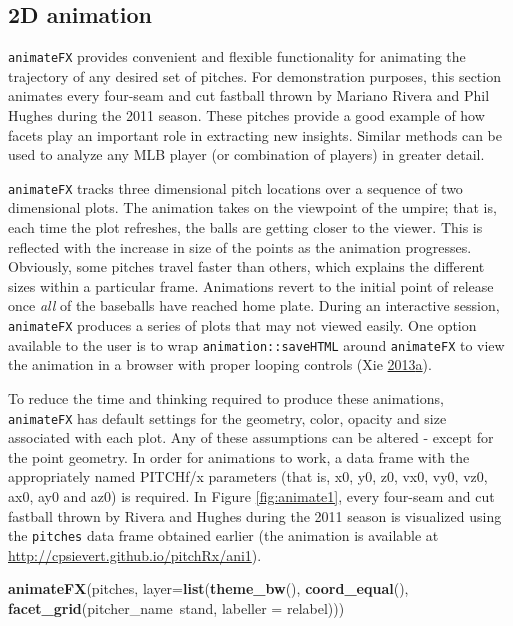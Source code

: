 \documentclass[12pt,]{isuthesis}
\newenvironment{Shaded}{\begin{snugshade}}{\end{snugshade}}
\newcommand{\KeywordTok}[1]{\textcolor[rgb]{0.13,0.29,0.53}{\textbf{{#1}}}}
\newcommand{\DataTypeTok}[1]{\textcolor[rgb]{0.13,0.29,0.53}{{#1}}}
\newcommand{\NormalTok}[1]{{#1}}
\begin{document}
\subsection{2D animation}\label{d-animation}

\texttt{animateFX} provides convenient and flexible functionality for
animating the trajectory of any desired set of pitches. For
demonstration purposes, this section animates every four-seam and cut
fastball thrown by Mariano Rivera and Phil Hughes during the 2011
season. These pitches provide a good example of how facets play an
important role in extracting new insights. Similar methods can be used
to analyze any MLB player (or combination of players) in greater detail.

\texttt{animateFX} tracks three dimensional pitch locations over a
sequence of two dimensional plots. The animation takes on the viewpoint
of the umpire; that is, each time the plot refreshes, the balls are
getting closer to the viewer. This is reflected with the increase in
size of the points as the animation progresses. Obviously, some pitches
travel faster than others, which explains the different sizes within a
particular frame. Animations revert to the initial point of release once
\emph{all} of the baseballs have reached home plate. During an
interactive session, \texttt{animateFX} produces a series of plots that
may not viewed easily. One option available to the user is to wrap
\texttt{animation::saveHTML} around \texttt{animateFX} to view the
animation in a browser with proper looping controls (Xie
\protect\hyperlink{ref-animation}{2013}\protect\hyperlink{ref-animation}{a}).

To reduce the time and thinking required to produce these animations,
\texttt{animateFX} has default settings for the geometry, color, opacity
and size associated with each plot. Any of these assumptions can be
altered - except for the point geometry. In order for animations to
work, a data frame with the appropriately named PITCHf/x parameters
(that is, x0, y0, z0, vx0, vy0, vz0, ax0, ay0 and az0) is required. In
Figure \ref{fig:animate1}, every four-seam and cut fastball thrown by
Rivera and Hughes during the 2011 season is visualized using the
\texttt{pitches} data frame obtained earlier (the animation is available
at \url{http://cpsievert.github.io/pitchRx/ani1}).

\begin{Shaded}
\begin{Highlighting}[]
\KeywordTok{animateFX}\NormalTok{(pitches, }\DataTypeTok{layer=}\KeywordTok{list}\NormalTok{(}\KeywordTok{theme_bw}\NormalTok{(), }\KeywordTok{coord_equal}\NormalTok{(),}
  \KeywordTok{facet_grid}\NormalTok{(pitcher_name~stand, }\DataTypeTok{labeller =} \NormalTok{relabel)))}
\end{Highlighting}
\end{Shaded}
\end{document}
